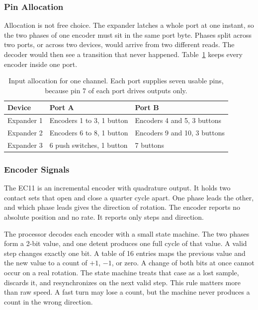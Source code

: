 \documentclass[11pt, letterpaper,titlepage]{article}
\begin{document}
\subsubsection*{Pin Allocation}
\label{sssec:pin-allocation}

Allocation is not free choice. The expander latches a whole port at one instant,
so the two phases of one encoder must sit in the same port byte. Phases split
across two ports, or across two devices, would arrive from two different reads.
The decoder would then see a transition that never happened.
Table~\ref{tab:pin-allocation} keeps every encoder inside one port.

\begin{table}[t]
\centering
\caption{Input allocation for one channel. Each port supplies seven usable
pins, because pin 7 of each port drives outputs only.}
\label{tab:pin-allocation}
\begin{tabular}{l l l}
\toprule
\textbf{Device} & \textbf{Port A} & \textbf{Port B} \\
\midrule
Expander 1 & Encoders 1 to 3, 1 button & Encoders 4 and 5, 3 buttons \\
Expander 2 & Encoders 6 to 8, 1 button & Encoders 9 and 10, 3 buttons \\
Expander 3 & 6 push switches, 1 button & 7 buttons \\
\bottomrule
\end{tabular}
\end{table}

\subsubsection*{Encoder Signals}
\label{sssec:quadrature}

The EC11 is an incremental encoder with quadrature output. It holds two contact
sets that open and close a quarter cycle apart. One phase leads the other, and
which phase leads gives the direction of rotation. The encoder reports no
absolute position and no rate. It reports only steps and direction.

The processor decodes each encoder with a small state machine. The two phases
form a 2-bit value, and one detent produces one full cycle of that value. A
valid step changes exactly one bit. A table of 16 entries maps the previous
value and the new value to a count of $+1$, $-1$, or zero. A change of both bits
at once cannot occur on a real rotation. The state machine treats that case as a
lost sample, discards it, and resynchronizes on the next valid step. This rule
matters more than raw speed. A fast turn may lose a count, but the machine never
produces a count in the wrong direction.
\end{document}
